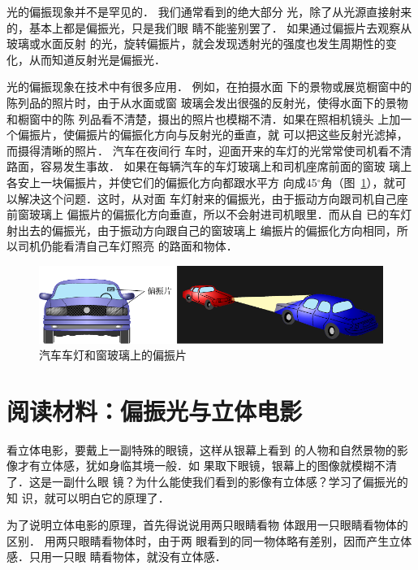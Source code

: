 光的偏振现象并不是罕见的．
我们通常看到的绝大部分
光，除了从光源直接射来的，基本上都是偏振光，只是我们眼
睛不能鉴别罢了．
如果通过偏振片去观察从玻璃或水面反射
的光，旋转偏振片，就会发现透射光的强度也发生周期性的变
化，从而知道反射光是偏振光．

光的偏振现象在技术中有很多应用．
例如，在拍摄水面
下的景物或展览橱窗中的陈列品的照片时，由于从水面或窗
玻璃会发出很强的反射光，使得水面下的景物和橱窗中的陈
列品看不清楚，摄出的照片也模糊不清．如果在照相机镜头
上加一个偏振片，使偏振片的偏振化方向与反射光的垂直，就
可以把这些反射光滤掉，而摄得清晰的照片．
汽车在夜间行
车时，迎面开来的车灯的光常常使司机看不清路面，容易发生事故．
如果在每辆汽车的车灯玻璃上和司机座席前面的窗玻
璃上各安上一块偏振片，并使它们的偏振化方向都跟水平方
向成45$^\circ$角（图~\ref{fig_C_6-14}），就可以解决这个问题．这时，从对面
车灯射来的偏振光，由于振动方向跟司机自己座前窗玻璃上
偏振片的偏振化方向垂直，所以不会射进司机眼里．而从自
已的车灯射出去的偏振光，由于振动方向跟自己的窗玻璃上
编振片的偏振化方向相同，所以司机仍能看清自己车灯照亮
的路面和物体．

\begin{figure}[htbp]
    \centering
    \includegraphics{fig/C/6-14.pdf}
    \caption{汽车车灯和窗玻璃上的偏振片}\label{fig_C_6-14}
\end{figure}

\section*{阅读材料：偏振光与立体电影}
看立体电影，要戴上一副特殊的眼镜，这样从银幕上看到
的人物和自然景物的影像才有立体感，犹如身临其境一般．如
果取下眼镜，银幕上的图像就模糊不清了．这是一副什么眼
镜？为什么能使我们看到的影像有立体感？学习了偏振光的知
识，就可以明白它的原理了．

为了说明立体电影的原理，首先得说说用两只眼睛看物
体跟用一只眼睛看物体的区别．
用两只眼睛看物体时，由于两
眼看到的同一物体略有差别，因而产生立体感．只用一只眼
睛看物体，就没有立体感．

